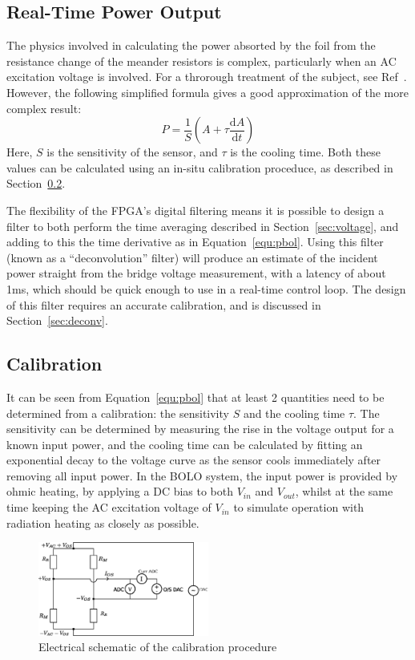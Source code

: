 \documentclass[12pt,a4paper]{article}
\begin{document}
\subsection{Real-Time Power Output}
\label{sec:rtpower}
The physics involved in calculating the power absorted by the foil from the resistance change of the meander resistors is complex, particularly when an AC
excitation voltage is involved. For a throrough treatment of the subject, see Ref~\cite{giannone-2002}. However, the following simplified formula gives a
good approximation of the more complex result:
\begin{equation}
  \label{equ:pbol}
  P = \frac{1}{S}\left(A + \tau \frac{\mathrm{d}A}{\mathrm{d}t}\right)
\end{equation}
Here, $S$ is the sensitivity of the sensor, and $\tau$ is the cooling time. Both these values can be calculated using an in-situ calibration proceduce, as
described in Section~\ref{sec:calibration}.

The flexibility of the FPGA's digital filtering means it is possible to design a filter to both perform the time averaging described in
Section~\ref{sec:voltage}, and adding to this the time derivative as in Equation~\ref{equ:pbol}. Using this filter (known as a ``deconvolution'' filter)
will produce an estimate of the incident power straight from the bridge voltage measurement, with a latency of about 1ms, which should be quick enough to
use in a real-time control loop. The design of this filter requires an accurate calibration, and is discussed in Section~\ref{sec:deconv}.

\subsection{Calibration}
\label{sec:calibration}
It can be seen from Equation~\ref{equ:pbol} that at least 2 quantities need to be determined from a calibration: the sensitivity $S$ and the cooling time
$\tau$. The sensitivity can be determined by measuring the rise in the voltage output for a known input power, and the cooling time can be calculated by
fitting an exponential decay to the voltage curve as the sensor cools immediately after removing all input power. In the BOLO system, the input power is
provided by ohmic heating, by applying a DC bias to both $V_{in}$ and $V_{out}$, whilst at the same time keeping the AC excitation voltage of $V_{in}$ to
simulate operation with radiation heating as closely as possible.

\begin{figure}
  \centering
  \includegraphics[width=0.5\textwidth]{calibration.eps}
  \caption{Electrical schematic of the calibration procedure\label{fig:calibration}}
\end{figure}
\end{document}
